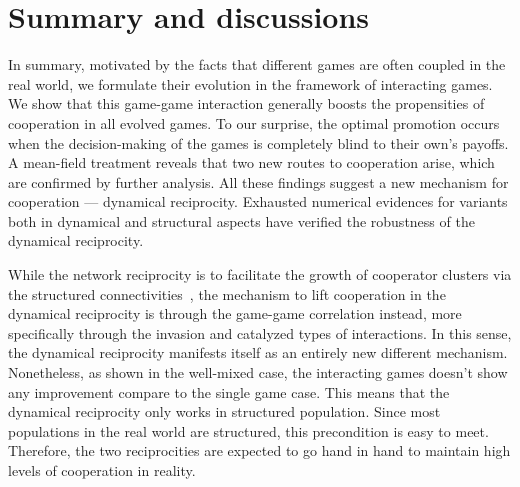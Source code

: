 \documentclass[showpacs,superscriptaddress,reprint,nofootinbib,amsmath,amssymb,aps,pre]{revtex4-1}
\begin{document}

\section{Summary and discussions}\label{sec:summary}
In summary, motivated by the facts that different games are often coupled in the real world, we formulate their evolution in the framework of interacting games. We show that this game-game interaction generally boosts the propensities of cooperation in all evolved games. To our surprise, the optimal promotion occurs when the decision-making of the games is completely blind to their own's payoffs. A mean-field treatment reveals that two new routes to cooperation arise, which are confirmed by further analysis. All these findings suggest a new mechanism for cooperation --- dynamical reciprocity. Exhausted numerical evidences for variants both in dynamical and structural aspects have verified the robustness of the dynamical reciprocity. 

While the network reciprocity is to facilitate the growth of cooperator clusters via the structured connectivities~\cite{Nowak2004Evolutionary,szabo2007evolutionary}, the mechanism to lift cooperation in the dynamical reciprocity is through the game-game correlation instead, more specifically through the invasion and catalyzed types of interactions. In this sense, the dynamical reciprocity manifests itself as an entirely new different mechanism. Nonetheless, as shown in the well-mixed case, the interacting games doesn't show any improvement compare to the single game case. This means that the dynamical reciprocity  only works in structured population. Since most populations in the real world are structured, this precondition is easy to meet. Therefore, the two reciprocities are expected to go hand in hand to maintain high levels of cooperation in reality.
\end{document}
